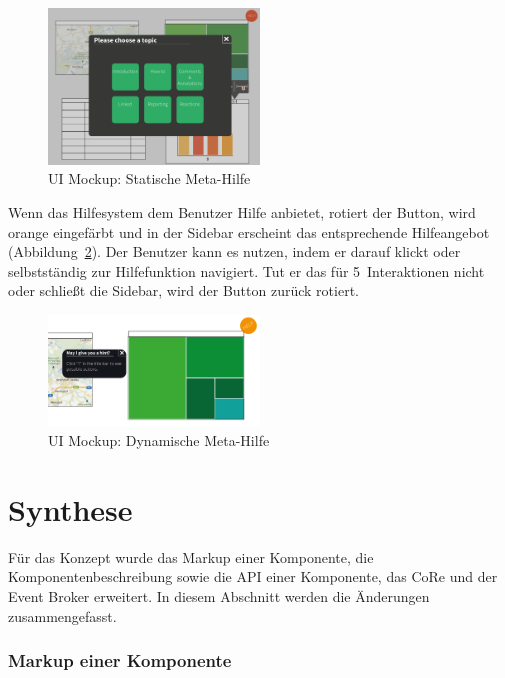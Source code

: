 \documentclass[
	headsepline,
	footsepline,
	fontsize=12pt,
	bibliography=totoc
]{scrbook}
\begin{document}
\begin{figure}[htbp]
   \centering
   \includegraphics[width=0.5\textwidth]{images/konzeption-meta-step2.png}
   \caption{UI Mockup: Statische Meta-Hilfe}
   \label{figure:meta-step2}
\end{figure}

Wenn das Hilfesystem dem Benutzer Hilfe anbietet, rotiert der Button, wird orange eingefärbt und in der Sidebar erscheint das entsprechende Hilfeangebot (Abbildung~\ref{figure:meta-dyn}). Der Benutzer kann es nutzen, indem er darauf klickt oder selbstständig zur Hilfefunktion navigiert. Tut er das für 5~Interaktionen nicht oder schließt die Sidebar, wird der Button zurück rotiert. 

\begin{figure}[htbp]
   \centering
   \includegraphics[width=0.5\textwidth]{images/konzeption-meta-dyn.png}
   \caption{UI Mockup: Dynamische Meta-Hilfe}
   \label{figure:meta-dyn}
\end{figure}

\section{Synthese}
\label{section:konzeption:synthese}

Für das Konzept wurde das Markup einer Komponente, die Komponentenbeschreibung sowie die API einer Komponente, das CoRe und der Event Broker erweitert. In diesem Abschnitt werden die Änderungen zusammengefasst.

\subsubsection{Markup einer Komponente}
\end{document}
